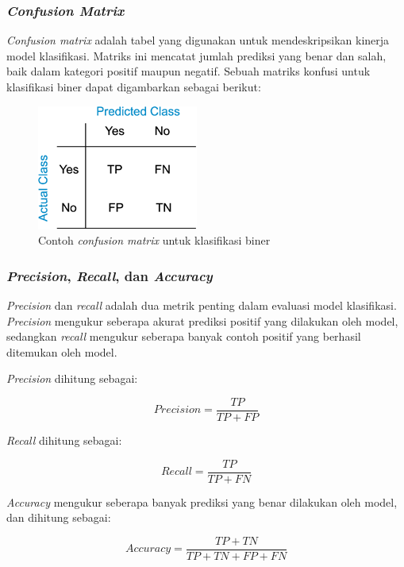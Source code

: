 \subsubsection{\emph{Confusion Matrix}}
\emph{Confusion matrix} adalah tabel yang digunakan untuk mendeskripsikan kinerja model klasifikasi. Matriks ini mencatat jumlah prediksi yang benar dan salah, baik dalam kategori positif maupun negatif. Sebuah matriks konfusi untuk klasifikasi biner dapat digambarkan sebagai berikut:

\begin{figure} [H] \centering
  \includegraphics[scale=0.7]{gambar/cf.png}
  \caption{Contoh \emph{confusion matrix} untuk klasifikasi biner}
  \label{fig:cf}
\end{figure}

\subsubsection{\emph{Precision}, \emph{Recall}, dan \emph{Accuracy}}
\emph{Precision} dan \emph{recall} adalah dua metrik penting dalam evaluasi model klasifikasi. \emph{Precision} mengukur seberapa akurat prediksi positif yang dilakukan oleh model, sedangkan \emph{recall} mengukur seberapa banyak contoh positif yang berhasil ditemukan oleh model.

\emph{Precision} dihitung sebagai:

\begin{equation}
  Precision = \frac{TP}{TP + FP}
\end{equation}

\emph{Recall} dihitung sebagai:

\begin{equation}
 Recall = \frac{TP}{TP + FN}
\end{equation}

\emph{Accuracy} mengukur seberapa banyak prediksi yang benar dilakukan oleh model, dan dihitung sebagai:

\begin{equation}
 Accuracy = \frac{TP + TN}{TP + TN + FP + FN}
\end{equation}

